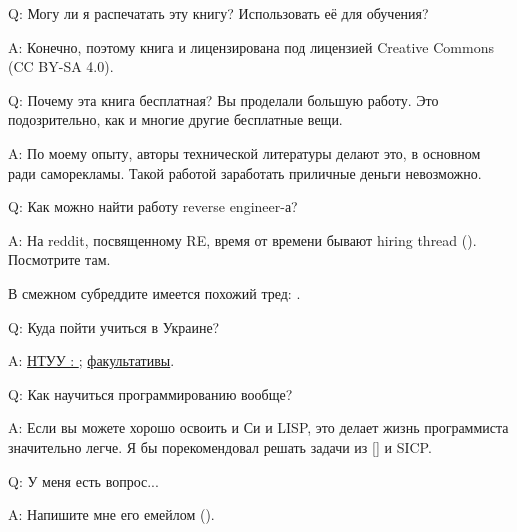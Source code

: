 \par Q: Могу ли я распечатать эту книгу? Использовать её для обучения?
\par A: Конечно, поэтому книга и лицензирована под лицензией Creative Commons (CC BY-SA 4.0).

\par Q: Почему эта книга бесплатная? Вы проделали большую работу. Это подозрительно, как и многие другие бесплатные вещи.
\par A: По моему опыту, авторы технической литературы делают это, в основном ради саморекламы. Такой работой заработать приличные деньги невозможно.

\par Q: Как можно найти работу reverse engineer-а?
\par A: На reddit, посвященному RE\FNURLREDDIT, время от времени бывают hiring thread (\RedditHiringThread{}).
Посмотрите там.

В смежном субреддите  имеется похожий тред: \NetsecHiringThread{}.

\par Q: Куда пойти учиться в Украине?
\par A: \href{http://go.yurichev.com/17336}{НТУУ : };
\href{http://go.yurichev.com/17337}{факультативы}.

\par Q: Как научиться программированию вообще?
\par A: Если вы можете хорошо освоить и Си и LISP, это делает жизнь программиста значительно легче.
Я бы порекомендовал решать задачи из [\KRBook] и \ac{SICP}.

\par Q: У меня есть вопрос...
\par A: Напишите мне его емейлом (\EMAIL).
